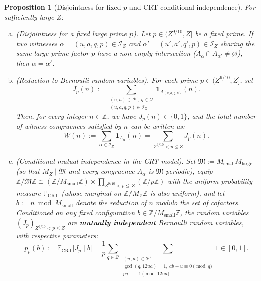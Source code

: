 \documentclass[11pt, a4paper]{article}
\theoremstyle{plain}
\newtheorem{proposition}[theorem]{Proposition}
\theoremstyle{definition}
\newcommand{\Z}{\mathbb{Z}}
\newcommand{\Pbb}{\mathbb{P}}
\newcommand{\Ebb}{\mathbb{E}}
\newcommand{\ind}{\mathbf{1}}
\begin{document}
\begin{proposition}[Disjointness for fixed $p$ and CRT conditional independence]\label{prop:incompatibilite_et_Bernoulli}
For sufficiently large $Z$:
\begin{enumerate}[(a)]
    \item \emph{(Disjointness for a fixed large prime $p$).} Let $p \in (Z^{9/10}, Z]$ be a fixed prime. If two witnesses $\alpha = (u,a,q,p) \in \mathcal{I}_Z$ and $\alpha' = (u',a',q',p) \in \mathcal{I}_Z$ sharing the same large prime factor $p$ have a non-empty intersection ($A_\alpha \cap A_{\alpha'} \ne \varnothing$), then $\alpha = \alpha'$.
    \item \emph{(Reduction to Bernoulli random variables).} For each prime $p \in (Z^{9/10}, Z]$, set
    \begin{equation}\label{eq:def_Jp}
    J_p(n) := \sum_{\substack{(u,a) \in \mathcal{P}',\ q \in \mathcal{Q} \\ (u,a,q,p) \in \mathcal{I}_Z}} \ind_{A_{(u,a,q,p)}}(n).
    \end{equation}
    Then, for every integer $n \in \Z$, we have $J_p(n) \in \{0, 1\}$, and the total number of witness congruences satisfied by $n$ can be written as:
    \[
    W(n) := \sum_{\alpha \in \mathcal{I}_Z} \ind_{A_\alpha}(n) = \sum_{Z^{9/10} < p \le Z} J_p(n).
    \]
    \item \emph{(Conditional mutual independence in the CRT model).} Set $\mathfrak{M} := M_{\mathrm{small}} M_{\mathrm{large}}$ (so that $M_Z \mid \mathfrak{M}$ and every congruence $A_\alpha$ is $\mathfrak{M}$-periodic), equip\linebreak $\Z / \mathfrak{M} \Z \cong (\Z / M_{\mathrm{small}} \Z) \times \prod_{Z^{9/10} < p \le Z} (\Z / p\Z)$ with the uniform probability measure $\Pbb_{\mathrm{CRT}}$ (whose marginal on $\Z / M_Z \Z$ is also uniform), and let $b := n \bmod M_{\mathrm{small}}$ denote the reduction of $n$ modulo the set of cofactors. Conditioned on any fixed configuration $b \in \Z / M_{\mathrm{small}} \Z$, the random variables $(J_p)_{Z^{9/10} < p \le Z}$ are \textbf{mutually independent} Bernoulli random variables, with respective parameters:
    \begin{equation}\label{eq:formule_pp_b}
    p_p(b) := \Ebb_{\mathrm{CRT}}\big[J_p \mid b\big] = \frac{1}{p} \sum_{q \in \mathcal{Q}} \sum_{\substack{(u,a) \in \mathcal{P}' \\ \gcd(q, 12ua)=1,\ ab+u \equiv 0 \pmod q \\ pq \equiv -1 \pmod{12ua}}} 1 \in [0, 1].
    \end{equation}
\end{enumerate}
\end{proposition}
\end{document}
